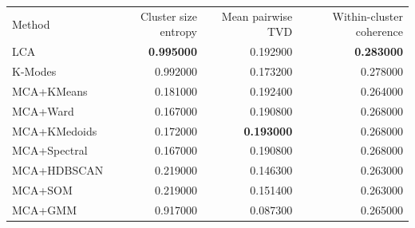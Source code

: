 \begin{tabular}{lrrr}
Method & Cluster size entropy & Mean pairwise TVD & Within-cluster coherence \\
LCA & \bfseries 0.995000 & 0.192900 & \bfseries 0.283000 \\
K-Modes & 0.992000 & 0.173200 & 0.278000 \\
MCA+KMeans & 0.181000 & 0.192400 & 0.264000 \\
MCA+Ward & 0.167000 & 0.190800 & 0.268000 \\
MCA+KMedoids & 0.172000 & \bfseries 0.193000 & 0.268000 \\
MCA+Spectral & 0.167000 & 0.190800 & 0.268000 \\
MCA+HDBSCAN & 0.219000 & 0.146300 & 0.263000 \\
MCA+SOM & 0.219000 & 0.151400 & 0.263000 \\
MCA+GMM & 0.917000 & 0.087300 & 0.265000 \\
\end{tabular}
